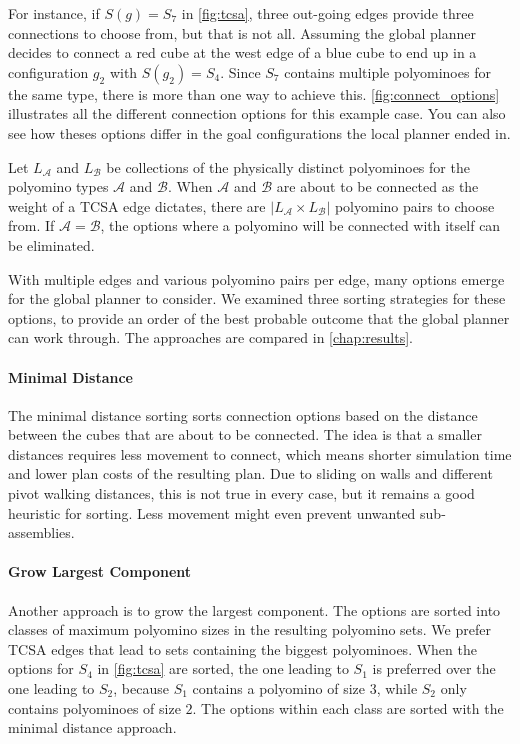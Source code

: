 For instance, if $S(g) = S_7$ in \autoref{fig:tcsa}, three out-going edges provide three connections to choose from, but that is not all.
Assuming the global planner decides to connect a red cube at the west edge of a blue cube to end up in a configuration $g_2$ with $S(g_2) = S_4$.
Since $S_7$ contains multiple polyominoes for the same type, there is more than one way to achieve this.
\autoref{fig:connect_options} illustrates all the different connection options for this example case.
You can also see how theses options differ in the goal configurations the local planner ended in.

Let $L_\mathcal{A}$ and $L_\mathcal{B}$ be collections of the physically distinct polyominoes for the polyomino types $\mathcal{A}$ and $\mathcal{B}$.
When $\mathcal{A}$ and $\mathcal{B}$ are about to be connected as the weight of a TCSA edge dictates, there are $\left| L_\mathcal{A} \times L_\mathcal{B} \right|$ polyomino pairs to choose from.
If $\mathcal{A} = \mathcal{B}$, the options where a polyomino will be connected with itself can be eliminated.

With multiple edges and various polyomino pairs per edge, many options emerge for the global planner to consider.
We examined three sorting strategies for these options, to provide an order of the best probable outcome that the global planner can work through. 
The approaches are compared in \autoref{chap:results}.

\paragraph{Minimal Distance}

The minimal distance sorting sorts connection options based on the distance between the cubes that are about to be connected.
The idea is that a smaller distances requires less movement to connect, which means shorter simulation time and lower plan costs of the resulting plan.
Due to sliding on walls and different pivot walking distances, this is not true in every case, but it remains a good heuristic for sorting.
Less movement might even prevent unwanted sub-assemblies.

\paragraph{Grow Largest Component}

Another approach is to grow the largest component.
The options are sorted into classes of maximum polyomino sizes in the resulting polyomino sets.
We prefer TCSA edges that lead to sets containing the biggest polyominoes.
When the options for $S_4$ in \autoref{fig:tcsa} are sorted, the one leading to $S_1$ is preferred over the one leading to $S_2$, because $S_1$ contains a polyomino of size $3$, while $S_2$ only contains polyominoes of size $2$. 
The options within each class are sorted with the minimal distance approach.

